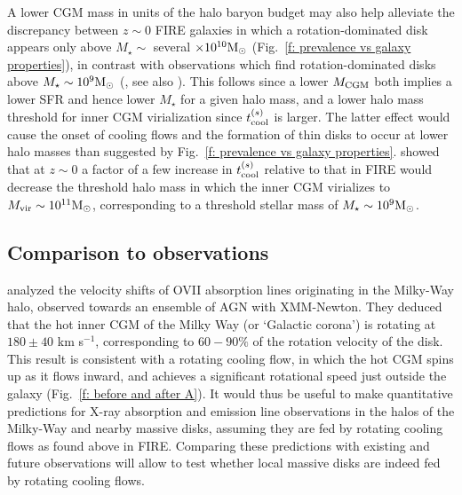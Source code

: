 \documentclass[fleqn,usenatbib]{mnras}
\newcommand{\msun}{{\rm M}_\odot}
\begin{document}
A lower CGM mass in units of the halo baryon budget may also help alleviate the discrepancy between $z\sim0$ FIRE galaxies in which a rotation-dominated disk appears only above $M_\star\sim$ several $\times 10^{10}\msun$ (Fig.~\ref{f: prevalence vs galaxy properties}), in contrast with observations which find rotation-dominated
disks above $M_\star\sim10^9\msun$ (\citealt{El-Badry2018, El-Badry2018a}, see also \citealt{Peebles2020}).
This follows since a lower $M_{\rm CGM}$ both implies a lower SFR and hence lower $M_\star$ for a given halo mass, and a lower halo mass threshold for inner CGM virialization since $t_{\rm cool}^{(s)}$ is larger.
The latter effect would cause the onset of cooling flows and the formation of thin disks to occur at lower halo masses than suggested by Fig.~\ref{f: prevalence vs galaxy properties}.
\cite{Stern2021} showed that at $z\sim0$ a factor of a few increase in $t_{\rm cool}^{(s)}$ relative to that in FIRE would decrease the threshold halo mass in which the inner CGM virializes to $M_{\rm vir}\sim10^{11}\msun$, corresponding to a threshold stellar mass of $M_\star\sim10^9\msun$.

\subsection{Comparison to observations}

\cite{Hodges-Kluck2016} analyzed the velocity shifts of O{\sc VII} absorption lines originating in the Milky-Way halo, observed towards an ensemble of AGN with XMM-Newton.
They deduced that the hot inner CGM of the Milky Way (or `Galactic corona') is rotating at $180\pm40$ km s$^{-1}$, corresponding to $60-90\%$ of the rotation velocity of the disk.
This result is consistent with a rotating cooling flow, in which the hot CGM spins up as it flows inward, and achieves a significant rotational speed just outside the galaxy (Fig.~\ref{f: before and after A}).
It would thus be useful to make quantitative predictions for X-ray absorption and emission line observations in the halos of the Milky-Way and nearby massive disks, assuming they are fed by rotating cooling flows as found above in FIRE.
Comparing these predictions with existing and future observations \citep[e.g. with Lynx,][]{arXiv:1809.09642} will allow to test whether local massive disks are indeed fed by rotating cooling flows. 
\end{document}
